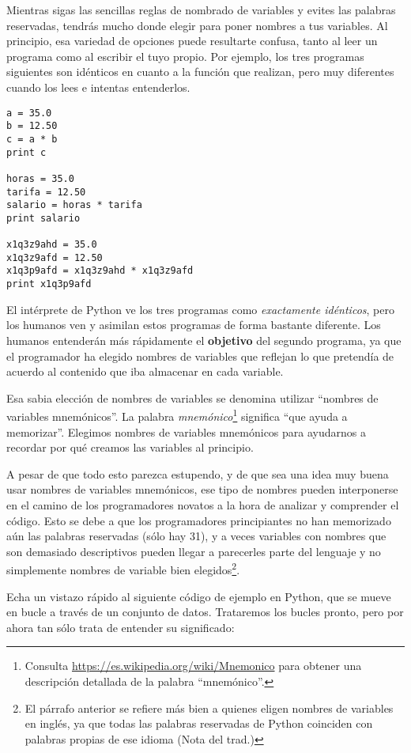 
Mientras sigas las sencillas reglas de nombrado de variables y evites las
palabras reservadas, tendrás mucho donde elegir para poner nombres a tus variables.
Al principio, esa variedad de opciones puede resultarte confusa, tanto al leer un programa
como al escribir el tuyo propio. Por ejemplo, los tres
programas siguientes son idénticos en cuanto a la función que realizan,
pero muy diferentes cuando los lees e intentas entenderlos.

\beforeverb
\begin{verbatim}
a = 35.0
b = 12.50
c = a * b
print c

horas = 35.0
tarifa = 12.50
salario = horas * tarifa
print salario

x1q3z9ahd = 35.0
x1q3z9afd = 12.50
x1q3p9afd = x1q3z9ahd * x1q3z9afd
print x1q3p9afd
\end{verbatim}
\afterverb
%
El intérprete de Python ve los tres programas como \emph{exactamente idénticos},
pero los humanos ven y asimilan estos programas de forma bastante diferente.
Los humanos entenderán más rápidamente el {\bf objetivo}
del segundo programa, ya que el programador
ha elegido nombres de variables que reflejan lo que pretendía
de acuerdo al contenido que iba almacenar en cada variable.

Esa sabia elección de nombres de variables se denomina utilizar ``nombres de variables mnemónicos''.
La palabra \emph{mnemónico}\footnote{Consulta
\url{https://es.wikipedia.org/wiki/Mnemonico}
para obtener una descripción detallada de la palabra ``mnemónico''.}
significa ``que ayuda a memorizar''.
Elegimos nombres de variables mnemónicos para ayudarnos a recordar por qué creamos las variables
al principio.

A pesar de que todo esto parezca estupendo, y de que sea una idea muy buena usar nombres
de variables mnemónicos, ese tipo de nombres pueden interponerse en el camino de los programadores
novatos a la hora de analizar y comprender el código. Esto se debe a que los programadores
principiantes no han memorizado aún las palabras reservadas (sólo hay 31), y a veces
variables con nombres que son demasiado descriptivos pueden llegar a parecerles
parte del lenguaje y no simplemente nombres de variable bien elegidos\footnote{El párrafo anterior
se refiere más bien a quienes eligen nombres de variables en inglés, ya que todas las
palabras reservadas de Python coinciden con palabras propias de ese idioma (Nota del trad.)}.

Echa un vistazo rápido al siguiente código de ejemplo en Python, que se mueve en bucle a través de
un conjunto de datos. Trataremos los bucles pronto, pero por ahora tan sólo trata de entender
su significado:

